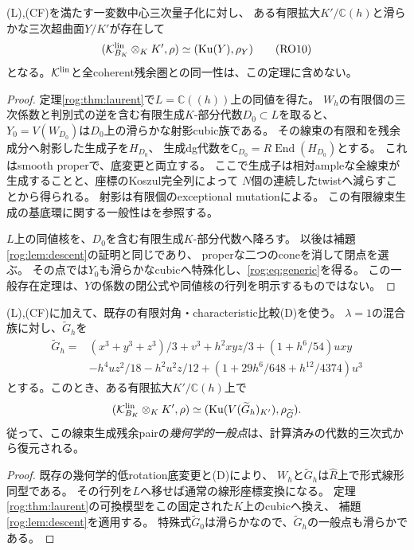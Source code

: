 \begin{theorem}[一変数量子化の幾何学的一般点]\label{rog:thm:geometric-generic}
\textup{(L),(CF)}を満たす一変数中心三次量子化に対し、
ある有限拡大$K'/\mathbb C(h)$と滑らかな三次超曲面$Y/K'$が存在して
\[
 (\mathcal K^{\rm lin}_{B_K}\otimes_KK',\rho)
 \simeq(\operatorname{Ku}(Y),\rho_Y)
 \tag{RO10}\label{rog:eq:generic}
\]
となる。$\mathcal K^{\rm lin}$と全coherent残余圏との同一性は、この定理に含めない。
\end{theorem}
\begin{proof}
定理\ref{rog:thm:laurent}で$L=\mathbb C((h))$上の同値を得た。
$W_h$の有限個の三次係数と判別式の逆を含む有限生成$K$-部分代数$D_0\subset L$を取ると、
$Y_0=V(W_{D_0})$は$D_0$上の滑らかな射影cubic族である。
その線束の有限和を残余成分へ射影した生成子を$H_{D_0}$、
生成dg代数を$\mathsf C_{D_0}=R\operatorname{End}(H_{D_0})$とする。
これはsmooth properで、底変更と両立する。
ここで生成子は相対ampleな全線束が生成することと、座標のKoszul完全列によって
$N$個の連続したtwistへ減らすことから得られる。
射影は有限個のexceptional mutationによる。
この有限線束生成の基底環に関する一般性は\cite[\S36.16]{ROGStacks}を参照する。

$L$上の同値核を、$D_0$を含む有限生成$K$-部分代数へ降ろす。
以後は補題\ref{rog:lem:descent}の証明と同じであり、
properな二つのconeを消して閉点を選ぶ。
その点では$Y_0$も滑らかなcubicへ特殊化し、\eqref{rog:eq:generic}を得る。
この一般存在定理は、$Y$の係数の閉公式や同値核の行列を明示するものではない。
\end{proof}

\begin{corollary}[計算済み混合三次式への復元]\label{rog:cor:mixed}
\textup{(L),(CF)}に加えて、既存の有限対角・characteristic比較\textup{(D)}を使う。
$\lambda=1$の混合族に対し、$\widetilde G_h$を
\[
\begin{aligned}
 \widetilde G_h={}&(x^3+y^3+z^3)/3+v^3+h^2xyz/3+(1+h^6/54)uxy\\
 &-h^4uz^2/18-h^2u^2z/12+
 (1+29h^6/648+h^{12}/4374)u^3
\end{aligned}
\tag{RO11}\label{rog:eq:explicit}
\]
とする。このとき、ある有限拡大$K'/\mathbb C(h)$上で
\[
 (\mathcal K^{\rm lin}_{B_K}\otimes_KK',\rho)
 \simeq(\operatorname{Ku}(V(\widetilde G_h)_{K'}),\rho_{\widetilde G}) .
\]
従って、この線束生成残余pairの\emph{幾何学的一般点}は、計算済みの代数的三次式から復元される。
\end{corollary}
\begin{proof}
既存の幾何学的低rotation底変更と\textup{(D)}により、
$W_h$と$\widetilde G_h$は$\widehat R$上で形式線形同型である。
その行列を$L$へ移せば通常の線形座標変換になる。
定理\ref{rog:thm:laurent}の可換模型をこの固定された$K$上のcubicへ換え、
補題\ref{rog:lem:descent}を適用する。
特殊式$\widetilde G_0$は滑らかなので、$\widetilde G_h$の一般点も滑らかである。
\end{proof}

